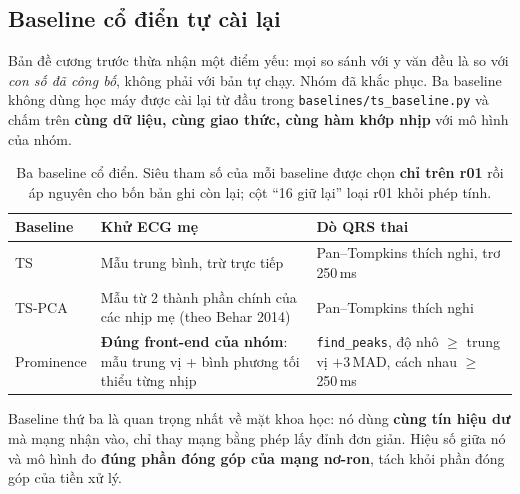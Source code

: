 \subsection{Baseline cổ điển tự cài lại}
\label{sec:baselines}

Bản đề cương trước thừa nhận một điểm yếu: mọi so sánh với y văn đều là so với \textit{con số đã công
bố}, không phải với bản tự chạy. Nhóm đã khắc phục. Ba baseline không dùng học máy được cài lại từ đầu
trong \texttt{baselines/ts\_baseline.py} và chấm trên \textbf{cùng dữ liệu, cùng giao thức, cùng hàm khớp
nhịp} với mô hình của nhóm.

\begin{table}[H]\centering\small
\caption{Ba baseline cổ điển. Siêu tham số của mỗi baseline được chọn \textbf{chỉ trên r01} rồi áp
nguyên cho bốn bản ghi còn lại; cột ``16 giữ lại'' loại r01 khỏi phép tính.}
\label{tab:baseline_mota}
\begin{tabular}{@{}L{2.6cm} L{6.2cm} L{5.6cm}@{}}
\toprule
\textbf{Baseline} & \textbf{Khử ECG mẹ} & \textbf{Dò QRS thai} \\
\midrule
TS & Mẫu trung bình, trừ trực tiếp & Pan--Tompkins thích nghi, trơ 250\,ms \\
TS-PCA & Mẫu từ 2 thành phần chính của các nhịp mẹ (theo Behar 2014) & Pan--Tompkins thích nghi \\
Prominence & \textbf{Đúng front-end của nhóm}: mẫu trung vị + bình phương tối thiểu từng nhịp &
\texttt{find\_peaks}, độ nhô $\geq$ trung vị $+ 3\,$MAD, cách nhau $\geq$ 250\,ms \\
\bottomrule
\end{tabular}
\end{table}

Baseline thứ ba là quan trọng nhất về mặt khoa học: nó dùng \textbf{cùng tín hiệu dư} mà mạng nhận vào,
chỉ thay mạng bằng phép lấy đỉnh đơn giản. Hiệu số giữa nó và mô hình đo \textbf{đúng phần đóng góp của
mạng nơ-ron}, tách khỏi phần đóng góp của tiền xử lý.

